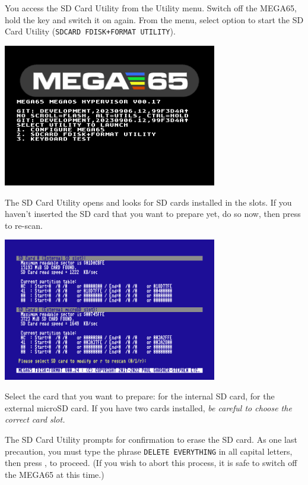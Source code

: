 You access the SD Card Utility from the Utility menu. Switch off the MEGA65, hold the  key and switch it on again. From the menu, select option  to start the SD Card Utility (\texttt{SDCARD FDISK+FORMAT UTILITY}).

\begin{center}
\includegraphics[width=0.7\textwidth]{images/ss-utilmenu.png}
\end{center}

The SD Card Utility opens and looks for SD cards installed in the slots. If you haven't inserted the SD card that you want to prepare yet, do so now, then press  to re-scan.

\begin{center}
  \includegraphics[width=0.7\textwidth]{images/ss-m65fdisk-busselect.png}
\end{center}

Select the card that you want to prepare:  for the internal SD card,  for the external microSD card. If you have two cards installed, {\em be careful to choose the correct card slot.}

The SD Card Utility prompts for confirmation to erase the SD card. As one last precaution, you must type the phrase {\tt DELETE EVERYTHING} in all capital letters, then press , to proceed. (If you wish to abort this process, it is safe to switch off the MEGA65 at this time.)


